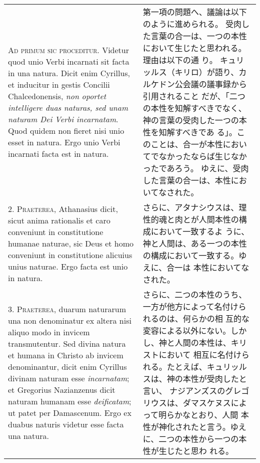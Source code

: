 \documentclass[10pt]{jsarticle} %
\begin{document}
\begin{longtable}{p{21em}p{21em}}

{\Huge A}{\scshape d primum sic proceditur}. Videtur quod unio Verbi incarnati sit facta in
una natura. Dicit enim Cyrillus, et inducitur in gestis Concilii
Chalcedonensis, {\itshape non oportet intelligere duas naturas, sed unam naturam
Dei Verbi incarnatam}. Quod quidem non fieret nisi unio esset in
natura. Ergo unio Verbi incarnati facta est in natura.


&

第一項の問題へ、議論は以下のように進められる。
受肉した言葉の合一は、一つの本性において生じたと思われる。理由は以下の通
 り。
キュリッルス（キリロ）が語り、カルケドン公会議の議事録から引用されること
 だが、「二つの本性を知解すべきでなく、神の言葉の受肉した一つの本性を知解すべきであ
 る」。このことは、合一が本性においてでなかったならば生じなかったであろう。
 ゆえに、受肉した言葉の合一は、本性においてなされた。



\\



2. {\scshape Praeterea}, Athanasius dicit, sicut anima rationalis et caro conveniunt
in constitutione humanae naturae, sic Deus et homo conveniunt in
constitutione alicuius unius naturae. Ergo facta est unio in natura.


&


さらに、アタナシウスは、理性的魂と肉とが人間本性の構成において一致するよ
 うに、神と人間は、ある一つの本性の構成において一致する。ゆえに、合一は
 本性においてなされた。

\\



3. {\scshape Praeterea}, duarum naturarum una non denominatur ex altera nisi aliquo
modo in invicem transmutentur. Sed divina natura et humana in Christo ab
invicem denominantur, dicit enim Cyrillus divinam naturam esse
{\itshape incarnatam}; et Gregorius Nazianzenus dicit naturam humanam esse
{\itshape deificatam}; ut patet per Damascenum. Ergo ex duabus naturis videtur esse
facta una natura.


&

さらに、二つの本性のうち、一方が他方によって名付けられるのは、何らかの相
 互的な変容による以外にない。しかし、神と人間の本性は、キリストにおいて
 相互に名付けられる。たとえば、キュリッルスは、神の本性が受肉したと言い、
 ナジアンズスのグレゴリウスは、ダマスケヌスによって明らかなとおり、人間
 本性が神化されたと言う。ゆえに、二つの本性から一つの本性が生じたと思わ
 れる。



\end{longtable}
\end{document}
